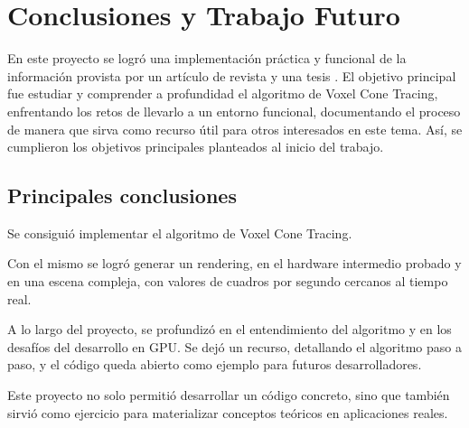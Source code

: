 \graphicspath{{chapters/6_conclusión/figures/}}



\chapter{Conclusiones y Trabajo Futuro}\label{chap:conclusions}

En este proyecto se logró una implementación práctica y funcional de la información provista por un artículo de revista \cite{voxel-cone-tracing} y una tesis \cite{gigavoxels}.
El objetivo principal fue estudiar y comprender a profundidad el algoritmo de Voxel Cone Tracing, enfrentando los retos de llevarlo a un entorno funcional, documentando el proceso de manera que sirva como recurso útil para otros interesados en este tema.
Así, se cumplieron los objetivos principales planteados al inicio del trabajo.

\section{Principales conclusiones}

Se consiguió implementar el algoritmo de Voxel Cone Tracing.

Con el mismo se logró generar un rendering, en el hardware intermedio probado y en una escena compleja, con valores de cuadros por segundo cercanos al tiempo real.

A lo largo del proyecto, se profundizó en el entendimiento del algoritmo y en los desafíos del desarrollo en GPU.
Se dejó un recurso, detallando el algoritmo paso a paso, y el código queda abierto como ejemplo para futuros desarrolladores.

Este proyecto no solo permitió desarrollar un código concreto, sino que también sirvió como ejercicio para materializar conceptos teóricos en aplicaciones reales.


